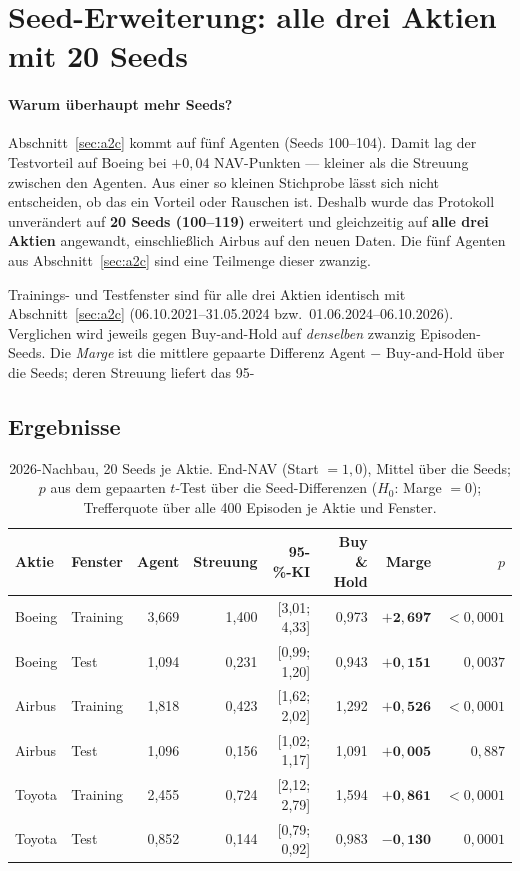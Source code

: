 \section{Seed-Erweiterung: alle drei Aktien mit 20 Seeds}

\paragraph{Warum überhaupt mehr Seeds?} Abschnitt~\ref{sec:a2c} kommt auf fünf Agenten
(Seeds 100--104). Damit lag der Testvorteil auf Boeing bei $+0{,}04$ NAV-Punkten --- kleiner
als die Streuung zwischen den Agenten. Aus einer so kleinen Stichprobe lässt sich nicht
entscheiden, ob das ein Vorteil oder Rauschen ist. Deshalb wurde das Protokoll unverändert auf
\textbf{20 Seeds (100--119)} erweitert und gleichzeitig auf \textbf{alle drei Aktien} angewandt,
einschließlich Airbus auf den neuen Daten. Die fünf Agenten aus Abschnitt~\ref{sec:a2c} sind
eine Teilmenge dieser zwanzig.

Trainings- und Testfenster sind für alle drei Aktien identisch mit Abschnitt~\ref{sec:a2c}
(06.10.2021--31.05.2024 bzw.\ 01.06.2024--06.10.2026). Verglichen wird jeweils gegen
Buy-and-Hold auf \emph{denselben} zwanzig Episoden-Seeds. Die \emph{Marge} ist die mittlere
gepaarte Differenz Agent $-$ Buy-and-Hold über die Seeds; deren Streuung liefert das
95-%

\subsection{Ergebnisse}

\begin{table}[H]
  \centering
  \caption{2026-Nachbau, 20 Seeds je Aktie. End-NAV (Start $=1{,}0$), Mittel über die Seeds;
           $p$ aus dem gepaarten $t$-Test über die Seed-Differenzen ($H_0$: Marge $=0$);
           Trefferquote über alle 400 Episoden je Aktie und Fenster.}
  \label{tab:seeds}
  \small
  \begin{tabular}{llrrrrrr}
    \toprule
    Aktie & Fenster & Agent & Streuung & 95-\%-KI & Buy \& Hold & Marge & $p$\\
    \midrule
    Boeing & Training & 3,669 & 1,400 & [3,01; 4,33] & 0,973 & $\mathbf{+2{,}697}$ & $<0{,}0001$\\
    Boeing & Test     & 1,094 & 0,231 & [0,99; 1,20] & 0,943 & $\mathbf{+0{,}151}$ & $0{,}0037$\\
    Airbus & Training & 1,818 & 0,423 & [1,62; 2,02] & 1,292 & $\mathbf{+0{,}526}$ & $<0{,}0001$\\
    Airbus & Test     & 1,096 & 0,156 & [1,02; 1,17] & 1,091 & $\mathbf{+0{,}005}$ & $0{,}887$\\
    Toyota & Training & 2,455 & 0,724 & [2,12; 2,79] & 1,594 & $\mathbf{+0{,}861}$ & $<0{,}0001$\\
    Toyota & Test     & 0,852 & 0,144 & [0,79; 0,92] & 0,983 & $\mathbf{-0{,}130}$ & $0{,}0001$\\
    \bottomrule
  \end{tabular}
\end{table}

